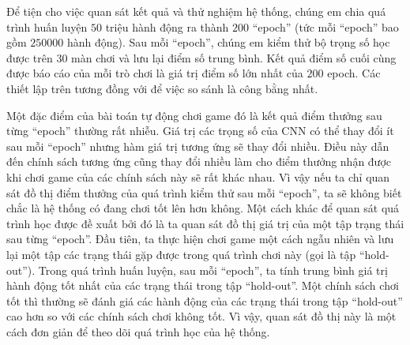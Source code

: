 	Để tiện cho việc quan sát kết quả và thử nghiệm hệ thống, chúng em chia quá trình huấn luyện $50$ triệu hành động ra thành $200$ ``epoch'' (tức mỗi ``epoch'' bao gồm $250000$ hành động).
	Sau mỗi ``epoch'', chúng em kiểm thử bộ trọng số học được trên $30$ màn chơi và lưu lại điểm số trung bình.
	Kết quả điểm số cuối cùng được báo cáo của mỗi trò chơi là giá trị điểm số lớn nhất của $200$ epoch.
	Các thiết lập trên tương đồng với \cite{mnihdqn2015} để việc so sánh là công bằng nhất.
	
	Một đặc điểm của bài toán tự động chơi game đó là kết quả điểm thưởng sau từng ``epoch'' thường rất nhiễu.
	Giá trị các trọng số của CNN có thể thay đổi ít sau mỗi ``epoch'' nhưng hàm giá trị tương ứng sẽ thay đổi nhiều.
	Điều này dẫn đến chính sách tương ứng cũng thay đổi nhiều làm cho điểm thưởng nhận được khi chơi game của các chính sách này sẽ rất khác nhau.
	Vì vậy nếu ta chỉ quan sát đồ thị điểm thưởng của quá trình kiểm thử sau mỗi ``epoch'', ta sẽ không biết chắc là hệ thống có đang chơi tốt lên hơn không.
	Một cách khác để quan sát quá trình học được đề xuất bởi \cite{mnih2013playing} đó là ta quan sát đồ thị giá trị của một tập trạng thái sau từng ``epoch''.
	Đầu tiên, ta thực hiện chơi game một cách ngẫu nhiên và lưu lại một tập các trạng thái gặp được trong quá trình chơi này (gọi là tập ``hold-out'').
	Trong quá trình huấn luyện, sau mỗi ``epoch'', ta tính trung bình giá trị hành động tốt nhất của các trạng thái trong tập ``hold-out''.
	Một chính sách chơi tốt thì thường sẽ đánh giá các hành động của các trạng thái trong tập ``hold-out'' cao hơn so với các chính sách chơi không tốt.
	Vì vậy, quan sát đồ thị này là một cách đơn giản để theo dõi quá trình học của hệ thống.
